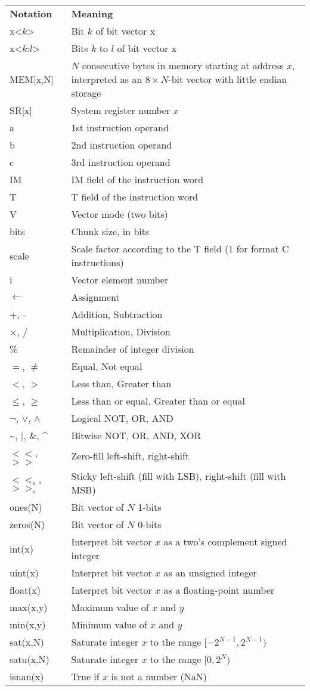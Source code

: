 \begin{tabular}{lp{400pt}}
\textbf{Notation} & \textbf{Meaning} \\
x<$k$> & Bit $k$ of bit vector x \\
x<$k$:$l$> & Bits $k$ to $l$ of bit vector x \\
MEM[x,N] & $N$ consecutive bytes in memory starting at address $x$, interpreted as an $8\times N$-bit vector with little endian storage \\
SR[x] & System register number $x$ \\
a & 1st instruction operand \\
b & 2nd instruction operand \\
c & 3rd instruction operand \\
IM & IM field of the instruction word \\
T & T field of the instruction word \\
V & Vector mode (two bits) \\
bits & Chunk size, in bits \\
scale & Scale factor according to the T field (1 for format C instructions) \\
i & Vector element number \\
$\leftarrow$ & Assignment \\
+, - & Addition, Subtraction \\
$\times$, / & Multiplication, Division \\
\% & Remainder of integer division \\
$=$, $\neq$ & Equal, Not equal \\
$<$, $>$ & Less than, Greater than \\
$\leq$, $\geq$ & Less than or equal, Greater than or equal \\
$\neg$, $\vee$, $\wedge$ & Logical NOT, OR, AND \\
\textasciitilde, $|$, \&, \textasciicircum & Bitwise NOT, OR, AND, XOR \\
$<<$, $>>$ & Zero-fill left-shift, right-shift \\
$<<_{s}$, $>>_{s}$ & Sticky left-shift (fill with LSB), right-shift (fill with MSB) \\
ones(N) & Bit vector of $N$ 1-bits \\
zeros(N) & Bit vector of $N$ 0-bits \\
int(x) & Interpret bit vector $x$ as a two's complement signed integer \\
uint(x) & Interpret bit vector $x$ as an unsigned integer \\
float(x) & Interpret bit vector $x$ as a floating-point number \\
max(x,y) & Maximum value of $x$ and $y$ \\
min(x,y) & Minimum value of $x$ and $y$ \\
sat(x,N) & Saturate integer $x$ to the range $[-2^{N-1},2^{N-1})$ \\
satu(x,N) & Saturate integer $x$ to the range $[0,2^{N})$ \\
isnan(x) & True if $x$ is not a number (NaN) \\
\end{tabular}

\clearpage


